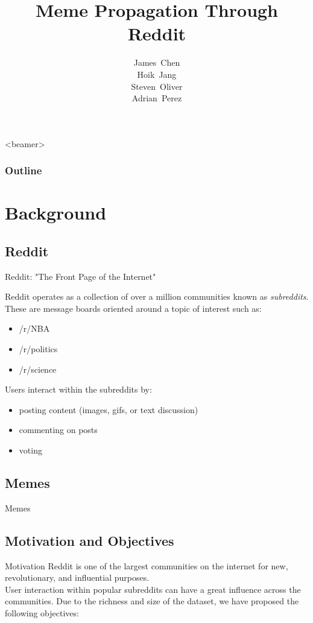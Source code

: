 \documentclass{beamer}
\title[Meme Propagation]{Meme Propagation Through Reddit}
\author[]{James~Chen \\ Hoik~Jang \\ Steven~Oliver \\ Adrian~Perez}
\begin{document}

\begin{frame}
 \titlepage
\end{frame}

\begin{frame}<beamer>
  \frametitle{Outline}
  \tableofcontents
\end{frame}

\section{Background} %

\subsection{Reddit} %

\begin{frame}{Reddit: "The Front Page of the Internet"}

Reddit operates as a collection of over a million communities known as \textit{subreddits}.
These are message boards oriented around a topic of interest such as:
\begin{itemize}
\item /r/NBA
\item /r/politics
\item /r/science
\end{itemize}
Users interact within the subreddits by:
\begin{itemize}
\item posting content (images, gifs, or text discussion)
\item commenting on posts
\item voting
\end{itemize}
\end{frame}

\subsection{Memes} %
\begin{frame}{Memes}

\end{frame}

\subsection{Motivation and Objectives} %
\begin{frame}{Motivation}
Reddit is one of the largest communities on the internet for new, revolutionary, and influential purposes. \\ User interaction within popular subreddits can have a great influence across the communities. Due to the richness and size of the dataset, we have proposed the following objectives:


\end{frame}
\end{document}

